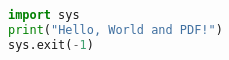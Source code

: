 \documentclass{article}
\begin{document}
\begin{lstlisting}[language=Python]
import sys
print("Hello, World and PDF!")
sys.exit(-1)
\end{lstlisting}
\end{document}

